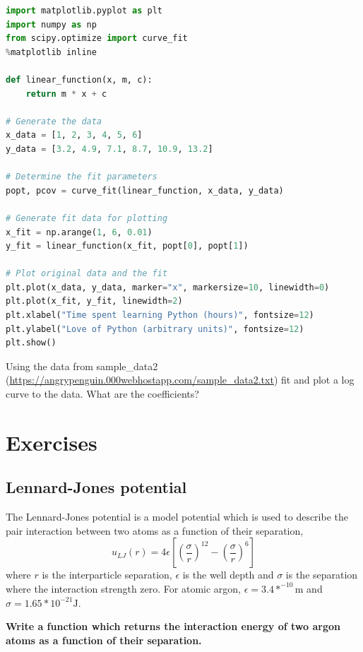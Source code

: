 \begin{lstlisting}[language=Python]
import matplotlib.pyplot as plt
import numpy as np
from scipy.optimize import curve_fit
%matplotlib inline

def linear_function(x, m, c):
    return m * x + c

# Generate the data
x_data = [1, 2, 3, 4, 5, 6]
y_data = [3.2, 4.9, 7.1, 8.7, 10.9, 13.2]

# Determine the fit parameters
popt, pcov = curve_fit(linear_function, x_data, y_data)

# Generate fit data for plotting
x_fit = np.arange(1, 6, 0.01)
y_fit = linear_function(x_fit, popt[0], popt[1])

# Plot original data and the fit
plt.plot(x_data, y_data, marker="x", markersize=10, linewidth=0)
plt.plot(x_fit, y_fit, linewidth=2)
plt.xlabel("Time spent learning Python (hours)", fontsize=12)
plt.ylabel("Love of Python (arbitrary units)", fontsize=12)
plt.show()
\end{lstlisting}
\begin{task}Using the data from sample\_data2 (\url{https://angrypenguin.000webhostapp.com/sample_data2.txt}) fit and plot a log curve to the data. What are the coefficients?\end{task}

\section{Exercises}
	\subsection{Lennard-Jones potential}\label{LJ_excercise}
		The Lennard-Jones potential is a model potential which is used to describe the pair interaction between two atoms as a function of their separation,
\begin{equation}u_{LJ}(r) = 4\epsilon \left [ \left (\frac{\sigma}{r} \right )^{12}- \left (\frac{\sigma}{r} \right )^{6} \right ]\end{equation}
	where $r$ is the interparticle separation, $\epsilon$ is the well depth and $\sigma$ is the separation where the interaction strength zero. For atomic argon, $\epsilon = 3.4*^{-10} \mathrm{m}$ and $\sigma= 1.65*10^{-21} \mathrm{J}$.
	
\textbf{Write a function which returns the interaction energy of two argon atoms as a function of their separation.}

